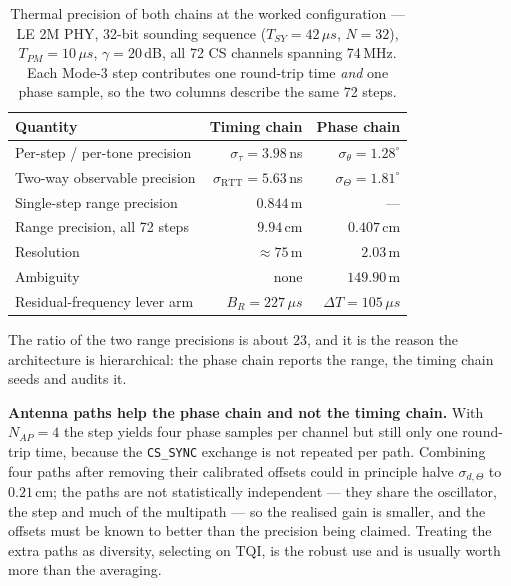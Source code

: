 \documentclass[11pt,a4paper]{article}
\newcommand{\us}{\,\ensuremath{\upmu}s}
\newcommand{\RTT}{\mathrm{RTT}}
\newcommand{\TQI}{\mathrm{TQI}}
\newcommand{\Tsy}{T_{SY}}
\newcommand{\Tpm}{T_{PM}}
\newcommand{\Nap}{N_{AP}}
\newcommand{\code}[1]{\texttt{\small #1}}
\providecommand{\upmu}{\mu}
\begin{document}
\begin{table}[h]
\caption{Thermal precision of both chains at the worked configuration --- LE 2M PHY, 32-bit sounding
sequence ($\Tsy=42\us$, $N=32$), $\Tpm=10\us$, $\gamma=20$\,dB, all 72 CS channels spanning 74\,MHz. Each
Mode-3 step contributes one round-trip time \emph{and} one phase sample, so the two columns describe
the same 72 steps.}
\label{tab:precision}
\centering\small
\begin{tabular}{@{}L{52mm}rr@{}}
\toprule
Quantity & Timing chain & Phase chain \\
\midrule
Per-step / per-tone precision & $\sigma_\tau = 3.98$\,ns & $\sigma_\theta = 1.28^{\circ}$ \\
Two-way observable precision & $\sigma_{\RTT} = 5.63$\,ns & $\sigma_\Theta = 1.81^{\circ}$ \\
Single-step range precision & $0.844$\,m & --- \\
Range precision, all 72 steps & $9.94$\,cm & $0.407$\,cm \\
Resolution & $\approx 75$\,m & $2.03$\,m \\
Ambiguity & none & $149.90$\,m \\
Residual-frequency lever arm & $B_R = 227\us$ & $\Delta T = 105\us$ \\
\bottomrule
\end{tabular}
\end{table}

The ratio of the two range precisions is about $23$, and it is the reason the architecture is
hierarchical: the phase chain reports the range, the timing chain seeds and audits it.

\begin{callout}
\textbf{Antenna paths help the phase chain and not the timing chain.} With $\Nap=4$ the step yields
four phase samples per channel but still only one round-trip time, because the \code{CS\_SYNC}
exchange is not repeated per path. Combining four paths after removing their calibrated offsets could
in principle halve $\sigma_{d,\Theta}$ to $0.21$\,cm; the paths are not statistically independent ---
they share the oscillator, the step and much of the multipath --- so the realised gain is smaller,
and the offsets must be known to better than the precision being claimed. Treating the extra paths as
diversity, selecting on $\TQI$, is the robust use and is usually worth more than the averaging.
\end{callout}

\end{document}
